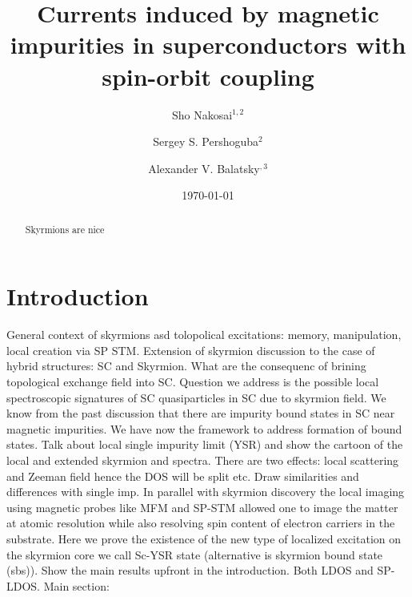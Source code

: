\documentclass[twocolumn,showpacs,floatfix,nofootinbib,longbibliography]{revtex4-1}
\begin{document}
\title{Currents induced by magnetic impurities in superconductors with spin-orbit coupling}

\author{Sho Nakosai$^{1,2}$}
\author{Sergey S. Pershoguba$^{2}$}
\author{Alexander V. Balatsky$^{,3}$}

\date{\today}


\begin{abstract}
Skyrmions are nice
\end{abstract}

\pacs{ }   


\maketitle
\section{Introduction} \label{sec:intro}

General context of skyrmions asd tolopolical excitations: memory, manipulation, local creation via SP STM.
Extension of skyrmion discussion to the case of hybrid structures: SC and Skyrmion. What are the consequenc of brining topological exchange field into SC. Question we address is the possible local spectroscopic signatures of SC quasiparticles in SC due to skyrmion field. We know from the past discussion that there are impurity bound states in SC near magnetic impurities. We have now the framework to address formation of bound states. Talk about local single impurity limit (YSR) and show the cartoon of the local and extended skyrmion and spectra. There are two effects: local scattering and Zeeman field hence the DOS will be split etc.  Draw similarities and differences with single imp.
In parallel with skyrmion discovery the local imaging using magnetic probes like MFM and SP-STM allowed one to image the matter at atomic resolution while also resolving spin content of electron carriers in the substrate.  
Here we prove the existence of the new type of localized excitation on the skyrmion core we call  Sc-YSR state (alternative is skyrmion bound state (sbs)).  Show the main results upfront in the introduction. Both LDOS and SP-LDOS. 
Main section: 
\end{document}
